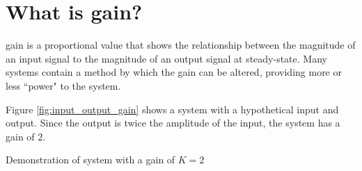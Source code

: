 \section{What is gain?}

\Gls{gain} is a proportional value that shows the relationship between the
magnitude of an input signal to the magnitude of an output signal at
steady-state. Many \glspl{system} contain a method by which the gain can be
altered, providing more or less ``power" to the \gls{system}.

Figure \ref{fig:input_output_gain} shows a \gls{system} with a hypothetical
input and output. Since the output is twice the amplitude of the input, the
\gls{system} has a gain of $2$.
\begin{bookfigure}

  \caption{Demonstration of system with a gain of $K = 2$}
  \label{fig:input_output_gain}
\end{bookfigure}

